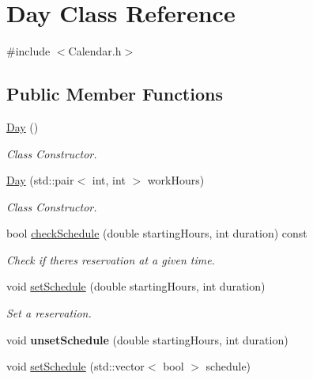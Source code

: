 \hypertarget{class_day}{}\section{Day Class Reference}
\label{class_day}


{\ttfamily \#include $<$Calendar.\+h$>$}

\subsection*{Public Member Functions}
\begin{DoxyCompactItemize}
\item 
\mbox{\label{class_day_a0d38b5839dd80b179cb8f0669283b3aa}} 
\mbox{\hyperlink{class_day_a0d38b5839dd80b179cb8f0669283b3aa}{Day}} ()
\begin{DoxyCompactList}\small\item\em Class Constructor. \end{DoxyCompactList}\item 
\mbox{\hyperlink{class_day_a0ba7af88eca9b5e6ca197c3d40b3ca66}{Day}} (std\+::pair$<$ int, int $>$ work\+Hours)
\begin{DoxyCompactList}\small\item\em Class Constructor. \end{DoxyCompactList}\item 
bool \mbox{\hyperlink{class_day_ae8354b4a88cd98f5513ea6bc5dfb017e}{check\+Schedule}} (double starting\+Hours, int duration) const
\begin{DoxyCompactList}\small\item\em Check if there\textquotesingle{}s reservation at a given time. \end{DoxyCompactList}\item 
void \mbox{\hyperlink{class_day_ad3c8ca8c171a994c59788965166ae36b}{set\+Schedule}} (double starting\+Hours, int duration)
\begin{DoxyCompactList}\small\item\em Set a reservation. \end{DoxyCompactList}\item 
\mbox{\label{class_day_a730572275262afd18b14cf60bbf98d29}} 
void {\bfseries unset\+Schedule} (double starting\+Hours, int duration)
\item 
void \mbox{\hyperlink{class_day_aa46e0811bd26355979c6cf9f4e4b9df7}{set\+Schedule}} (std\+::vector$<$ bool $>$ schedule)

\end{DoxyCompactItemize}

